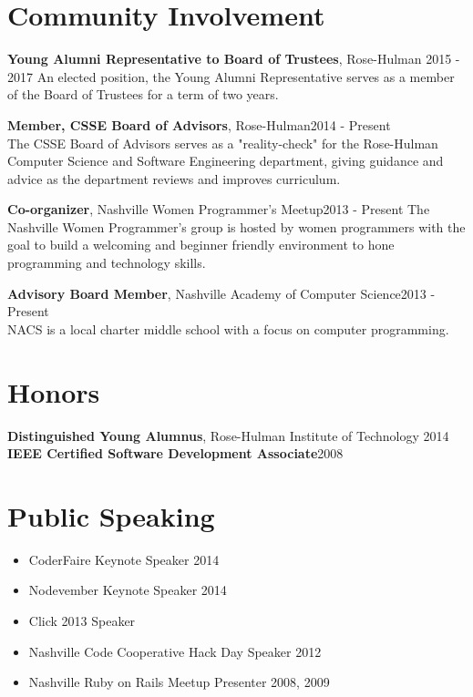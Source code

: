 \documentclass[line, margin, 10pt]{res}
\begin{document}
\begin{resume}
\section{Community Involvement}

{\bf Young Alumni Representative to Board of Trustees}, Rose-Hulman 2015 - 2017
An elected position, the Young Alumni Representative serves as a member of the Board of Trustees for a term of two years.

{\bf Member, CSSE Board of Advisors}, Rose-Hulman\hfill 2014 - Present\\
The CSSE Board of Advisors serves as a "reality-check" for the Rose-Hulman Computer Science and Software Engineering department, giving guidance and advice as the department reviews and improves curriculum.

{\bf Co-organizer}, Nashville Women Programmer's Meetup\hfill 2013 - Present
The Nashville Women Programmer's group is hosted by women programmers with the goal to build a welcoming and beginner friendly environment to hone programming and technology skills.

{\bf Advisory Board Member}, Nashville Academy of Computer Science\hfill 2013 - Present\\
NACS is a local charter middle school with a focus on computer programming.


\section{Honors}

{\bf Distinguished Young Alumnus}, Rose-Hulman Institute of Technology \hfill 2014\\
{\bf IEEE Certified Software Development Associate}\hfill 2008

\section{Public Speaking}

\begin{itemize}\itemsep -2pt
  \item CoderFaire Keynote Speaker 2014
  \item Nodevember Keynote Speaker 2014
  \item Click 2013 Speaker
  \item Nashville Code Cooperative Hack Day Speaker 2012
  \item Nashville Ruby on Rails Meetup Presenter 2008, 2009
\end{itemize}


\end{resume}
\end{document}
